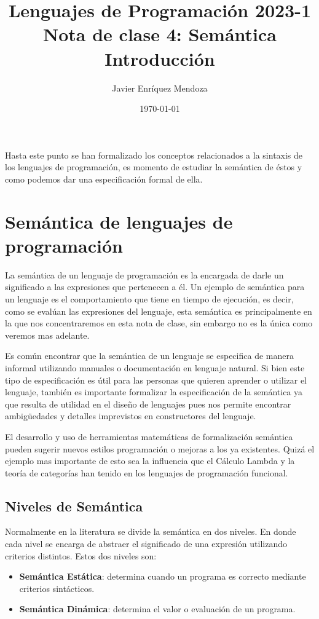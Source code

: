 \documentclass[12pt]{extarticle}
\title{\LARGE
Lenguajes de Programación 2023-1\\ 
Nota de clase 4: Semántica\\
\color{Orchid} Introducción}
\author{Javier Enríquez Mendoza}
\date{\today}
\begin{document}
\maketitle

Hasta este punto se han formalizado los conceptos relacionados a la sintaxis de los lenguajes de programación, es momento de estudiar la semántica de éstos y como podemos dar una especificación formal de ella.

\section{Semántica de lenguajes de programación}

La semántica de un lenguaje de programación es la encargada de darle un significado a las expresiones que pertenecen a él. Un ejemplo de semántica para un lenguaje es el comportamiento que tiene en tiempo de ejecución, es decir, como se evalúan las expresiones del lenguaje, esta semántica es principalmente en la que nos concentraremos en esta nota de clase, sin embargo no es la única como veremos mas adelante. 

Es común encontrar que la semántica de un lenguaje se especifica de manera informal utilizando manuales o documentación en lenguaje natural. Si bien este tipo de especificación es útil para las personas que quieren aprender o utilizar el lenguaje, también es importante formalizar la especificación de la semántica ya que resulta de utilidad en el diseño de lenguajes pues nos permite encontrar ambigüedades y detalles imprevistos en constructores del lenguaje.

El desarrollo y uso de herramientas matemáticas de formalización semántica pueden sugerir nuevos estilos programación o mejoras a los ya existentes. Quizá el ejemplo mas importante de esto sea la influencia que el Cálculo Lambda y la teoría de categorías han tenido en los lenguajes de programación funcional.

\subsection{Niveles de Semántica}
Normalmente en la literatura se divide la semántica en dos niveles. En donde cada nivel se encarga de abstraer el significado de una expresión utilizando criterios distintos. Estos dos niveles son:
\begin{itemize}
    \item {\bf Semántica Estática}: determina cuando un programa es correcto mediante criterios sintácticos.
    \item {\bf Semántica Dinámica}: determina el valor o evaluación de un programa.
\end{itemize}
\end{document}
